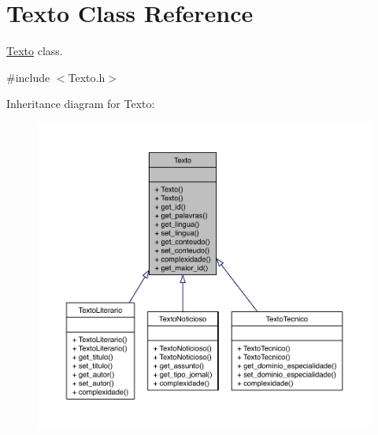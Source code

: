 \hypertarget{class_texto}{\section{Texto Class Reference}
\label{class_texto}
}


\hyperlink{class_texto}{Texto} class.  




{\ttfamily \#include $<$Texto.\-h$>$}



Inheritance diagram for Texto\-:
\nopagebreak
\begin{figure}[H]
\begin{center}
\leavevmode
\includegraphics[width=350pt]{class_texto__inherit__graph}
\end{center}
\end{figure}
